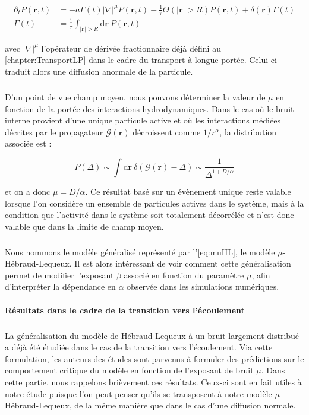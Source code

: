 \begin{equation}
\begin{aligned}
    \partial_t P(\mathbf{r}, t) &= -a\Gamma (t)|\nabla|^{\mu} P(\mathbf{r}, t) - \frac{1}{\tau}\Theta(|\mathbf{r}|>R)P(\mathbf{r}, t) + \delta(\mathbf{r})\Gamma (t)\\
     \Gamma (t) &= \frac{1}{\tau}\int_{|\mathbf{r}|>R}\mathrm{d}\mathbf{r}~P(\mathbf{r}, t)
\end{aligned}
    \label{eq:muHL}
\end{equation}

\noindent avec $|\nabla|^{\mu}$ l'opérateur de dérivée fractionnaire déjà défini au \autoref{chapter:TransportLP} dans le cadre du transport à longue portée. Celui-ci traduit alors une diffusion anormale de la particule.

\subparagraph{}D'un point de vue champ moyen, nous pouvons déterminer la valeur de $\mu$ en fonction de la portée des interactions hydrodynamiques. Dans le cas où le bruit interne provient d'une unique particule active et où les interactions médiées décrites par le propagateur $\mathcal{G}(\mathbf{r})$ décroissent comme $1/r^\alpha$, la distribution associée est :

\begin{equation}
	P(\Delta) \sim \int \mathrm{d}\mathbf{r}~\delta\left( \mathcal{G}(\mathbf{r})-\Delta \right)\sim \frac{1}{\Delta^{1+D/\alpha}}
\end{equation}

\noindent et on a donc $\mu = D/\alpha$. Ce résultat basé sur un évènement unique reste valable lorsque l'on considère un ensemble de particules actives dans le système, mais à la condition que l'activité dans le système soit totalement décorrélée et n'est donc valable que dans la limite de champ moyen.

\subparagraph{}Nous nommons le modèle généralisé représenté par l'\autoref{eq:muHL}, le modèle $\mu$-Hébraud-Lequeux. Il est alors intéressant de voir comment cette généralisation permet de modifier l'exposant $\beta$ associé en fonction du paramètre $\mu$, afin d'interpréter la dépendance en $\alpha$ observée dans les simulations numériques.

\paragraph{Résultats dans le cadre de la transition vers l'écoulement}

\subparagraph{}La généralisation du modèle de Hébraud-Lequeux à un bruit largement distribué a déjà été étudiée dans le cas de la transition vers l'écoulement. Via cette formulation, les auteurs des études \cite{lin_mean-field_2016, lin_microscopic_2018} sont parvenus à formuler des prédictions sur le comportement critique du modèle en fonction de l'exposant de bruit $\mu$. Dans cette partie, nous rappelons brièvement ces résultats. Ceux-ci sont en fait utiles à notre étude puisque l'on peut penser qu'ils se transposent à notre modèle $\mu$-Hébraud-Lequeux, de la même manière que dans le cas d'une diffusion normale.

